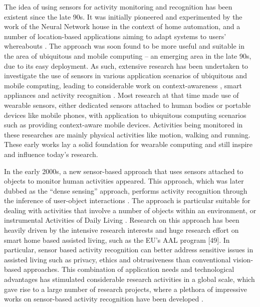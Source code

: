 The idea of using sensors for activity monitoring and recognition has been existent since the late 90s. It was initially pioneered and experimented by the work of the Neural Network house \cite{Mozer1998} in the context of home automation, and a number of location-based applications aiming to adapt systems to users’ whereabouts \cite{Leonhardt1998} \cite{Golding1999} \cite{Ward1997}. The approach was soon found to be more useful and suitable in the area of ubiquitous and mobile computing – an emerging area in the late 90s, due to its easy deployment. As such, extensive research has been undertaken to investigate the use of sensors in various application scenarios of ubiquitous and mobile computing, leading to considerable work on context-awareness \cite{Schmidt1999} \cite{Randell2000} \cite{Gellersen2002}, smart appliances \cite{Schmidt2001} \cite{Laerhoven2001} and activity recognition \cite{Laerhoven2001a} \cite{Foerster2000} \cite{Lee2002}. Most research at that time made use of wearable sensors, either dedicated sensors attached to human bodies or portable devices like mobile phones, with application to ubiquitous computing scenarios such as providing context-aware mobile devices. Activities being monitored in these researches are mainly physical activities like motion, walking and running. These early works lay a solid foundation for wearable computing and still inspire and influence today’s research.

In the early 2000s, a new sensor-based approach that uses sensors attached to objects to monitor human activities appeared. This approach, which was later dubbed as the “dense sensing” approach, performs activity recognition through the inference of user-object interactions \cite{Bao2004} \cite{Patterson2003}. The approach is particular suitable for dealing with activities that involve a number of objects within an environment, or instrumental Activities of Daily Living \cite{Chan2008} \cite{Nugent2009}. Research on this approach has been heavily driven by the intensive research interests and huge research effort on smart home based assisted living, such as the EU’s AAL program [49]. In particular, sensor based activity recognition can better address sensitive issues in assisted living such as privacy, ethics and obtrusiveness than conventional vision-based approaches. This combination of application needs and technological advantages has stimulated considerable research activities in a global scale, which gave rise to a large number of research projects, where a plethora of impressive works on sensor-based activity recognition have been developed \cite{Kern2003}  \cite{Mantyjarvi2001} \cite{Philipose2004} \cite{Patterson2005} \cite{Buettner2009} \cite{Wren2006} \cite{Gu2009} \cite{Patterson2003} \cite{Liao2007}.

